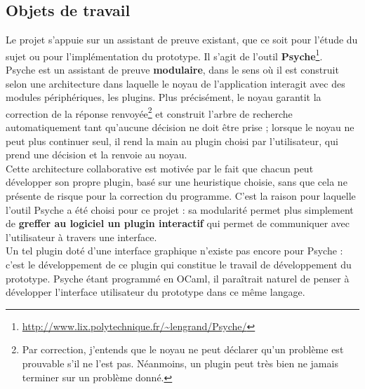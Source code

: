 \subsection{Objets de travail}

Le projet s'appuie sur un assistant de preuve existant, que ce soit pour l'étude du sujet ou pour l'implémentation du prototype. Il s'agit de l'outil \textbf{Psyche}\footnote{\url{http://www.lix.polytechnique.fr/~lengrand/Psyche/}}.\\

Psyche est un assistant de preuve \textbf{modulaire}, dans le sens où il est construit selon une architecture dans laquelle le noyau de l'application interagit avec des modules périphériques, les plugins. Plus précisément, le noyau garantit la correction de la réponse renvoyée\footnote{Par correction, j'entends que le noyau ne peut déclarer qu'un problème est prouvable s'il ne l'est pas. Néanmoins, un plugin peut très bien ne jamais terminer sur un problème donné.} et construit l'arbre de recherche automatiquement tant qu'aucune décision ne doit être prise ; lorsque le noyau ne peut plus continuer seul, il rend la main au plugin choisi par l'utilisateur, qui prend une décision et la renvoie au noyau.\\

Cette architecture collaborative est motivée par le fait que chacun peut développer son propre plugin, basé sur une heuristique choisie, sans que cela ne présente de risque pour la correction du programme. C'est la raison pour laquelle l'outil Psyche a été choisi pour ce projet : sa modularité permet plus simplement de \textbf{greffer au logiciel un plugin interactif} qui permet de communiquer avec l'utilisateur à travers une interface.\\

Un tel plugin doté d'une interface graphique n'existe pas encore pour Psyche : c'est le développement de ce plugin qui constitue le travail de développement du prototype. Psyche étant programmé en OCaml, il paraîtrait naturel de penser à développer l'interface utilisateur du prototype dans ce même langage.\\

